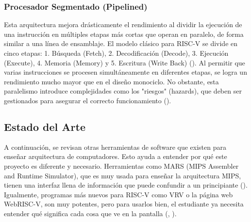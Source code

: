 \documentclass[12pt, letterpaper]{article}
\begin{document}
\subsubsection{Procesador Segmentado (Pipelined)}
Esta arquitectura mejora drásticamente el rendimiento al dividir la ejecución de una instrucción en múltiples etapas más cortas que operan en paralelo, de forma similar a una línea de ensamblaje. El modelo clásico para RISC-V se divide en cinco etapas: 1. Búsqueda (Fetch), 2. Decodificación (Decode), 3. Ejecución (Execute), 4. Memoria (Memory) y 5. Escritura (Write Back) (\cite{khairullah2022}). Al permitir que varias instrucciones se procesen simultáneamente en diferentes etapas, se logra un rendimiento mucho mayor que en el diseño monociclo. No obstante, esta paralelismo introduce complejidades como los "riesgos" (hazards), que deben ser gestionados para asegurar el correcto funcionamiento (\cite{ihtemam2024}).

\subsection{Estado del Arte}
A continuación, se revisan otras herramientas de software que existen para enseñar arquitectura de computadores. Esto ayuda a entender por qué este proyecto es diferente y necesario. Herramientas como MARS (MIPS Assembler and Runtime Simulator), que es muy usada para enseñar la arquitectura MIPS, tienen una interfaz llena de información que puede confundir a un principiante (\cite{vollmar2007}). Igualmente, programas más nuevos para RISC-V como VRV o la página web WebRISC-V, son muy potentes, pero para usarlos bien, el estudiante ya necesita entender qué significa cada cosa que ve en la pantalla (\cite{giorgi2019}, \cite{krim2025}).


\newpage

\end{document}
